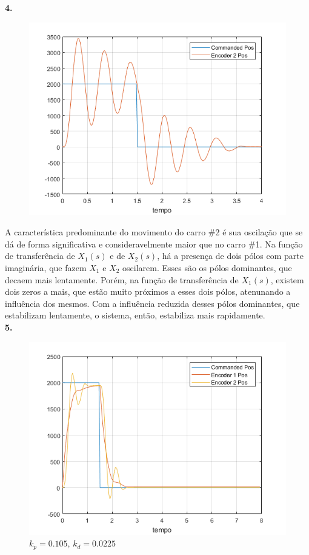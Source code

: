 \documentclass[a4paper,11pt]{article}
\begin{document}
\textbf{4.}

\begin{figure}[H]
\centering
\includegraphics{q04}
\end{figure}

A característica predominante do movimento do carro \#2 é sua oscilação
que se dá de forma significativa e consideravelmente maior que no carro \#1. Na
função de transferência de $X_1\left(s\right)$ e de $X_2\left(s\right)$, há a
presença de dois pólos com parte imaginária, que fazem $X_1$ e $X_2$ oscilarem.
Esses são os pólos dominantes, que decaem mais lentamente. Porém, na função de
transferência de $X_1\left(s\right)$, existem dois zeros a mais, que estão
muito próximos a esses dois pólos, atenunando a influência dos mesmos. Com a
influência reduzida desses pólos dominantes, que estabilizam lentamente, o
sistema, então, estabiliza mais rapidamente. \\

\textbf{5.}

\begin{figure}[H]
\centering
\includegraphics{q05}
\caption{$k_p = 0.105$, $k_d = 0.0225$}
\end{figure}
\end{document}
